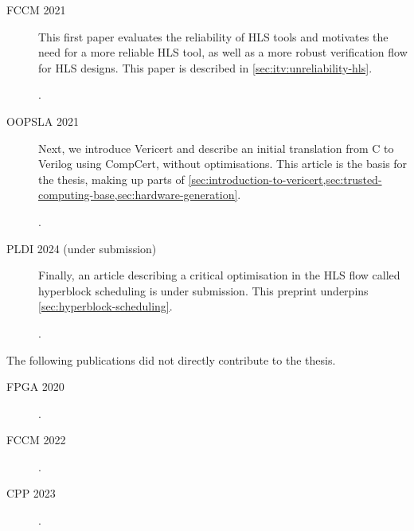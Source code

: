 \begin{description}

\item[FCCM 2021] This first paper evaluates the reliability of \gls{HLS} tools
  and motivates the need for a more reliable \gls{HLS} tool, as well as a more
  robust verification flow for \gls{HLS} designs.  This paper is described in
  \cref{sec:itv:unreliability-hls}.

  .

\item[OOPSLA 2021] Next, we introduce Vericert and describe an initial
  translation from C to Verilog using \gls{CompCert}, without optimisations.
  This article is the basis for the thesis, making up parts of
  \cref{sec:introduction-to-vericert,sec:trusted-computing-base,sec:hardware-generation}.

  .

\item[PLDI 2024 (under submission)] Finally, an article describing a critical
  optimisation in the \gls{HLS} flow called \gls{hyperblock scheduling} is under
  submission.  This preprint underpins \cref{sec:hyperblock-scheduling}.

  .

\end{description}

The following publications did not directly contribute to the thesis.

\begin{description}
\item[FPGA 2020] .
\item[FCCM 2022] .
\item[CPP 2023] .
\end{description}

